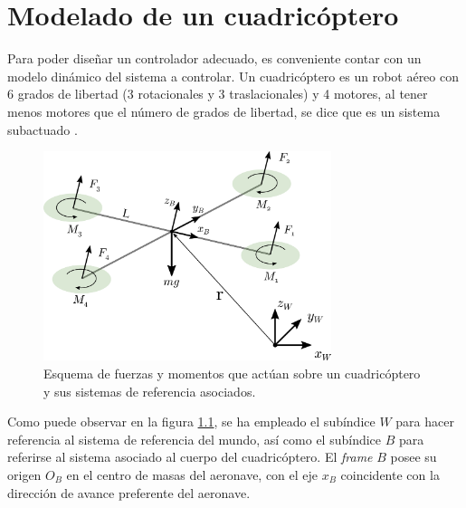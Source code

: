 \chapter{Modelado de un cuadricóptero}

Para poder diseñar un controlador adecuado, es conveniente contar con un modelo dinámico del sistema a controlar. Un cuadricóptero es un robot aéreo con 6 grados de libertad (3 rotacionales y 3 traslacionales) y 4 motores, al tener menos motores que el número de grados de libertad, se dice que es un sistema subactuado \cite{ferrin2011differential}\cite{MinimunSnap2011}\cite{mellinger2012trajectory}. 

\begin{figure}[htb!]
	\centering
	\includegraphics[width=0.75\textwidth]{imagenes/uav_coordinate_system}
	\caption{Esquema de fuerzas y momentos que actúan sobre un cuadricóptero y sus sistemas de referencia asociados. }
	\label{modelado:uav_coordinate}
\end{figure}

Como puede observar en la figura \ref{modelado:uav_coordinate}, se ha  empleado el subíndice $W$ para hacer referencia al sistema de referencia del mundo, así como el subíndice $B$ para referirse al sistema asociado al cuerpo del cuadricóptero. El \textit{frame} $B$ posee su origen $O_B$ en el centro de masas del  aeronave, con el eje $x_B$ coincidente con la dirección de avance preferente del aeronave.

